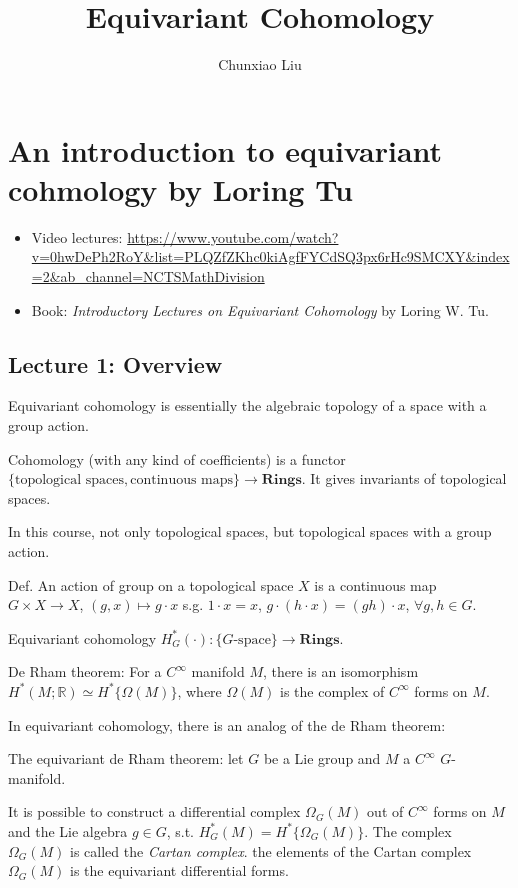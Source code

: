 \documentclass{article}
\title{Equivariant Cohomology}
\author{Chunxiao Liu}
\theoremstyle{mystyle}
\theoremstyle{remark}
\numberwithin{equation}{section}
\begin{document}
\maketitle




\tableofcontents

\section{An introduction to equivariant cohmology by Loring Tu}

\begin{itemize}
\item Video lectures: \url{https://www.youtube.com/watch?v=0hwDePh2RoY&list=PLQZfZKhc0kiAgfFYCdSQ3px6rHc9SMCXY&index=2&ab_channel=NCTSMathDivision}
\item Book: \emph{Introductory Lectures on
Equivariant Cohomology} by Loring W. Tu.
\end{itemize}

 
\subsection{Lecture 1: Overview}


Equivariant cohomology is essentially the algebraic topology of a space with a group action.

Cohomology (with any kind of coefficients) is a functor $\{\text{topological spaces},\text{continuous maps}\}\rightarrow \mathbf{Rings}$. It gives invariants of topological spaces.

In this course, not only topological spaces, but topological spaces with a group action.

Def. An action of group on a topological space $X$ is a continuous map $G\times X\rightarrow X$, $(g,x) \mapsto g\cdot x$ s.g. $1\cdot x = x$, $g\cdot(h\cdot x) = (gh)\cdot x$, $\forall g,h\in G$. 

Equivariant cohomology $H^*_G(\cdot)\colon \{G\text{-space}\}\rightarrow \mathbf{Rings}$.


De Rham theorem: For a $C^\infty$ manifold $M$, there is an isomorphism $H^*(M;\mathbb{R})\simeq H^*\{\Omega(M)\}$, where $\Omega(M)$ is the complex of $C^\infty$ forms on $M$. 

In equivariant cohomology, there is an analog of the de Rham theorem:

The equivariant de Rham theorem: let $G$ be a Lie group and $M $ a $C^\infty$ $G$-manifold. 

It is possible to construct a differential complex $\Omega_G(M)$ out of $C^\infty$ forms on $M$ and the Lie algebra $g\in G$, s.t. $H^*_G(M) = H^*\{\Omega_G(M)\}$. The complex $\Omega_G(M)$ is called the \emph{Cartan complex}. the elements of the Cartan complex $\Omega_G(M)$ is the equivariant differential forms.
\end{document}
